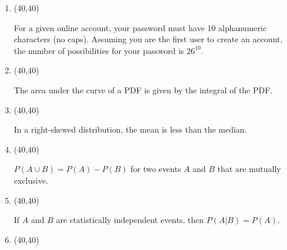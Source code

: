 \documentclass[12pt,twoside]{article}
\newcommand{\?}{\stackrel{?}{=}}
\newcommand{\gr}{\color{green!40!black}}
\begin{document}
\begin{enumerate}[\bf (i)]


\item \hfill
  \begin{minipage}{.1\linewidth}
    \framebox(40,40){ \gr }%
  \end{minipage}\quad
  \begin{minipage}{.85\linewidth}
    For a given online account, your password must have 10 alphanumeric characters (no caps). Assuming you are the first user to create an account, the number of possibilities for your password is $26^{10}$.
  \end{minipage}
  \smallskip
\item \hfill
  \begin{minipage}{.1\linewidth}
    \framebox(40,40){ \gr } %
  \end{minipage}\quad
  \begin{minipage}{.85\linewidth}
    The area under the curve of a PDF is given by the integral of the PDF.
  \end{minipage}  
  \smallskip
\item \hfill
  \begin{minipage}{.1\linewidth}
    \framebox(40,40){\gr  } %
  \end{minipage}\quad
  \begin{minipage}{.85\linewidth}
    In a right-skewed distribution, the mean is less than the median.
  \end{minipage}
  \smallskip
\item \hfill
  \begin{minipage}{.1\linewidth}
    \framebox(40,40){\gr } %
  \end{minipage}\quad
  \begin{minipage}{.85\linewidth}
    $P(A\cup B) = P(A) - P(B)$ for two events $A$ and $B$ that are mutually exclusive.
  \end{minipage}
  \smallskip  
\item \hfill
  \begin{minipage}{.1\linewidth}
    \framebox(40,40){\gr } %
  \end{minipage}\quad
  \begin{minipage}{.85\linewidth}
    If $A$ and $B$ are statistically independent events, then $P(A|B) = P(A)$.
  \end{minipage}
  \smallskip
  \item \hfill
    \begin{minipage}{.1\linewidth}
      \framebox(40,40){\gr  } %

\end{minipage}
\end{enumerate}
\end{document}
